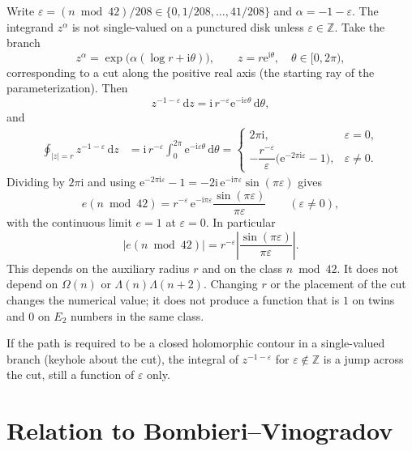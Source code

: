 \documentclass[11pt,a4paper]{article}
\theoremstyle{plain}
\theoremstyle{remark}
\newcommand{\Lam}{\Lambda}
\begin{document}
Write \(\varepsilon=(n\bmod 42)/208\in\{0,1/208,\ldots,41/208\}\) and \(\alpha=-1-\varepsilon\). The integrand \(z^\alpha\) is not single-valued on a punctured disk unless \(\varepsilon\in\mathbb{Z}\). Take the branch
\[
z^\alpha=\exp\bigl(\alpha(\log r+\mathrm{i}\theta)\bigr),\qquad z=r\mathrm{e}^{\mathrm{i}\theta},\quad \theta\in[0,2\pi),
\]
corresponding to a cut along the positive real axis (the starting ray of the parameterization). Then
\[
z^{-1-\varepsilon}\,\mathrm{d}z=\mathrm{i}\,r^{-\varepsilon}\mathrm{e}^{-\mathrm{i}\varepsilon\theta}\,\mathrm{d}\theta,
\]
and
\begin{align*}
\oint_{|z|=r}z^{-1-\varepsilon}\,\mathrm{d}z
&=\mathrm{i}\,r^{-\varepsilon}\int_0^{2\pi}\mathrm{e}^{-\mathrm{i}\varepsilon\theta}\,\mathrm{d}\theta
=\begin{cases}
2\pi\mathrm{i}, & \varepsilon=0,\\[4pt]
-\dfrac{r^{-\varepsilon}}{\varepsilon}\bigl(\mathrm{e}^{-2\pi\mathrm{i}\varepsilon}-1\bigr), & \varepsilon\neq 0.
\end{cases}
\end{align*}
Dividing by \(2\pi\mathrm{i}\) and using \(\mathrm{e}^{-2\pi\mathrm{i}\varepsilon}-1=-2\mathrm{i}\,\mathrm{e}^{-\mathrm{i}\pi\varepsilon}\sin(\pi\varepsilon)\) gives
\begin{equation}
\label{eq:e}
e(n\bmod 42)
=
r^{-\varepsilon}\,\mathrm{e}^{-\mathrm{i}\pi\varepsilon}\frac{\sin(\pi\varepsilon)}{\pi\varepsilon}
\qquad(\varepsilon\neq 0),
\end{equation}
with the continuous limit \(e=1\) at \(\varepsilon=0\). In particular
\[
\bigl|e(n\bmod 42)\bigr|
=r^{-\varepsilon}\left|\frac{\sin(\pi\varepsilon)}{\pi\varepsilon}\right|.
\]
This depends on the auxiliary radius \(r\) and on the class \(n\bmod 42\). It does not depend on \(\Omega(n)\) or \(\Lam(n)\Lam(n+2)\). Changing \(r\) or the placement of the cut changes the numerical value; it does not produce a function that is \(1\) on twins and \(0\) on \(E_2\) numbers in the same class.

If the path is required to be a closed holomorphic contour in a single-valued branch (keyhole about the cut), the integral of \(z^{-1-\varepsilon}\) for \(\varepsilon\notin\mathbb{Z}\) is a jump across the cut, still a function of \(\varepsilon\) only.

\section{Relation to Bombieri--Vinogradov}
\end{document}

